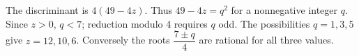 The discriminant is $ 4(49-4z)$. Thus $ 49-4z=q^2 $ for a nonnegative integer $ q $. Since $ z>0 $, $ q<7 $; reduction modulo 4 requires $ q $ odd. The possibilities $ q=1,3,5 $ give $\boxed{z=12,10,6}$. Conversely the roots $\dfrac{7\pm q}{4}$ are rational for all three values.
